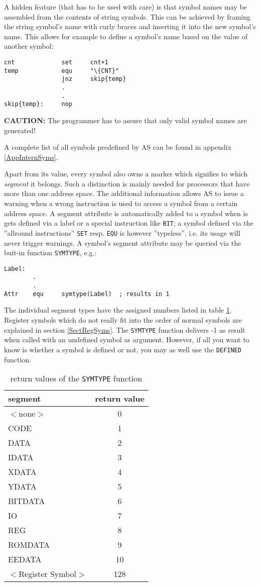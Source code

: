 \documentclass[12pt,twoside]{report}
\newcommand{\bb}[1]{{\bf #1}}
\newcommand{\tty}[1]{{\tt #1}}
\newcommand{\asname}{{AS}}
\begin{document}
A hidden feature (that has to be used with care) is that symbol names
may be assembled from the contents of string symbols.  This can be
achieved by framing the string symbol's name with curly braces and
inserting it into the new symbol's name.  This allows for example to
define a symbol's name based on the value of another symbol:
\begin{verbatim}
cnt             set     cnt+1
temp            equ     "\{CNT}"
                jnz     skip{temp}
                .
                .
skip{temp}:     nop
\end{verbatim}
\bb{CAUTION:} The programmer has to assure that only valid symbol names
are generated!

A complete list of all symbols predefined by \asname{} can be found in
appendix \ref{AppInternSyms}.

Apart from its value, every symbol also owns a marker which signifies to
which {\em segment} it belongs.  Such a distinction is mainly needed for
processors that have more than one address space.  The additional
information allows \asname{} to issue a warning when a wrong instruction is used
to access a symbol from a certain address space.  A segment attribute is
automatically added to a symbol when is gets defined via a label or a
special instruction like \tty{BIT}; a symbol defined via the ''allround
instructions'' \tty{SET} resp. \tty{EQU} is however ''typeless'', i.e. its
usage will never trigger warnings.  A symbol's segment attribute may be
queried via the buit-in function \tty{SYMTYPE}, e.g.:
\begin{verbatim}
Label:
        .
        .
Attr    equ     symtype(Label)  ; results in 1
\end{verbatim}
The individual segment types have the assigned numbers listed in table
\ref{TabSegNums}.  Register symbols which do not really fit into the order
of normal symbols are explained in section \ref{SectRegSyms}.  The
\tty{SYMTYPE} function delivers -1 as result when called with an undefined
symbol as argument.  However, if all you want to know is whether a symbol
is defined or not, you may as well use the \tty{DEFINED} function.
\begin{table}[htb]
\begin{center}
\begin{tabular}{|l|c|}
\hline
segment & return value \\
\hline
$<$none$>$ & 0 \\
CODE & 1 \\
DATA & 2 \\
IDATA & 3 \\
XDATA & 4 \\
YDATA & 5 \\
BITDATA & 6 \\
IO & 7 \\
REG & 8 \\
ROMDATA & 9 \\
EEDATA & 10 \\
$<$Register Symbol$>$ & 128 \\
\hline
\end{tabular}
\end{center}
\caption{return values of the \tty{SYMTYPE} function\label{TabSegNums}}
\end{table}
\end{document}
